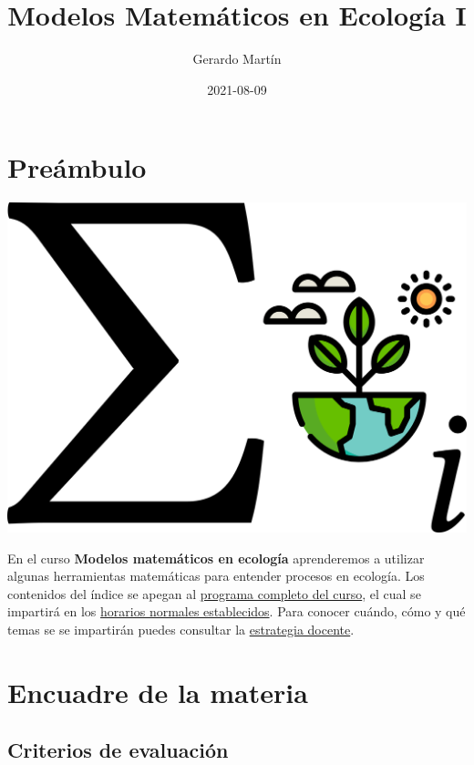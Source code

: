 \documentclass[
]{book}
\title{Modelos Matemáticos en Ecología I}
\author{Gerardo Martín}
\date{2021-08-09}
\begin{document}
\maketitle

{
\setcounter{tocdepth}{1}
\tableofcontents
}
\hypertarget{preuxe1mbulo}{%
\chapter{Preámbulo}\label{preuxe1mbulo}}

\begin{center}\includegraphics[width=20.83in]{logo} \end{center}

En el curso \textbf{Modelos matemáticos en ecología} aprenderemos a utilizar algunas herramientas matemáticas para entender procesos en ecología. Los contenidos del índice se apegan al \href{Programa-curso.pdf}{programa completo del curso}, el cual se impartirá en los \href{Horario.pdf}{horarios normales establecidos}. Para conocer cuándo, cómo y qué temas se se impartirán puedes consultar la \href{Estrategia-docente.pdf}{estrategia docente}.

\hypertarget{encuadre-de-la-materia}{%
\chapter{Encuadre de la materia}\label{encuadre-de-la-materia}}

\hypertarget{criterios-de-evaluaciuxf3n}{%
\section{Criterios de evaluación}\label{criterios-de-evaluaciuxf3n}}
\end{document}
